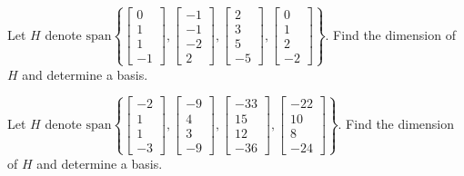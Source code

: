 \documentclass{ximera}
\begin{document}
\begin{problem}\label{prb:5.2} Let $H$ denote $\mbox{span}\left\{ \left[
\begin{array}{r}
0 \\
1 \\
1 \\
-1
\end{array}
\right] ,\left[
\begin{array}{r}
-1 \\
-1 \\
-2 \\
2
\end{array}
\right] ,\left[
\begin{array}{r}
2 \\
3 \\
5 \\
-5
\end{array}
\right] ,\left[
\begin{array}{r}
0 \\
1 \\
2 \\
-2
\end{array}
\right] \right\} .$ Find the dimension of $H$ and determine a basis.
\end{problem}


\begin{problem}\label{prb:5.3} Let $H$ denote $\mbox{span}\left\{ \left[
\begin{array}{r}
-2 \\
1 \\
1 \\
-3
\end{array}
\right] ,\left[
\begin{array}{r}
-9 \\
4 \\
3 \\
-9
\end{array}
\right] ,\left[
\begin{array}{r}
-33 \\
15 \\
12 \\
-36
\end{array}
\right] ,\left[
\begin{array}{r}
-22 \\
10 \\
8 \\
-24
\end{array}
\right] \right\} .$ Find the dimension of $H$ and determine a basis.
\end{problem}
\end{document}
